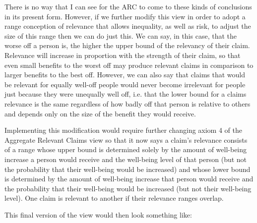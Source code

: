 \documentclass[man,11pt,a4paper]{apa7}
\begin{document}
There is no way that I can see for the ARC to come to these kinds of conclusions in its present form. However, if we further modify this view in order to adopt a range conception of relevance that allows inequality, as well as risk, to adjust the size of this range then we can do just this. We can say, in this case, that the worse off a person is, the higher the upper bound of the relevancy of their claim. Relevance will increase in proportion with the strength of their claim, so that even small benefits to the worst off may produce relevant claims in comparison to larger benefits to the best off. However, we can also say that claims that would be relevant for equally well-off people would never become irrelevant for people just because they were unequally well off, i.e. that the lower bound for a claims relevance is the same regardless of how badly off that person is relative to others and depends only on the size of the benefit they would receive.

Implementing this modification would require further changing axiom 4 of the Aggregate Relevant Claims view so that it now says a claim's relevance consists of a range whose upper bound is determined solely by the amount of well-being increase a person would receive and the well-being level of that person (but not the probability that their well-being would be increased) and whose lower bound is determined by the amount of well-being increase that person would receive and the probability that their well-being would be increased (but not their well-being level). One claim is relevant to another if their relevance ranges overlap.

This final version of the view would then look something like:
\end{document}
